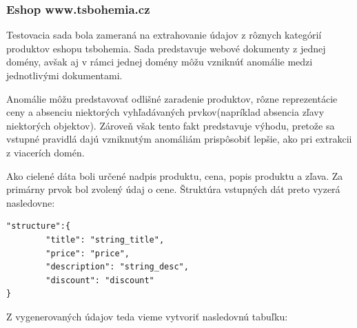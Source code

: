 \newpage

\subsubsection{Eshop www.tsbohemia.cz}

Testovacia sada bola zameraná na extrahovanie údajov z rôznych kategórií produktov eshopu tsbohemia. Sada predstavuje webové dokumenty z jednej domény, avšak aj v rámci jednej domény môžu vzniknúť anomálie medzi jednotlivými dokumentami.

Anomálie môžu predstavovať odlišné zaradenie produktov, rôzne reprezentácie ceny a absenciu niektorých vyhľadávaných prvkov(napríklad absencia zľavy niektorých objektov). Zároveň však tento fakt predstavuje výhodu, pretože sa vstupné pravidlá dajú vzniknutým anomáliám prispôsobiť lepšie, ako pri extrakcii z viacerích domén.

\bigskip

Ako cielené dáta boli určené nadpis produktu, cena, popis produktu a zľava. Za primárny prvok bol zvolený údaj o cene. Štruktúra vstupných dát preto vyzerá nasledovne:

\bigskip

\begin{lstlisting}
"structure":{
        "title": "string_title",
        "price": "price",
        "description": "string_desc",
        "discount": "discount"
}
\end{lstlisting}

\bigskip

Z vygenerovaných údajov teda vieme vytvoriť nasledovnú tabuľku:

